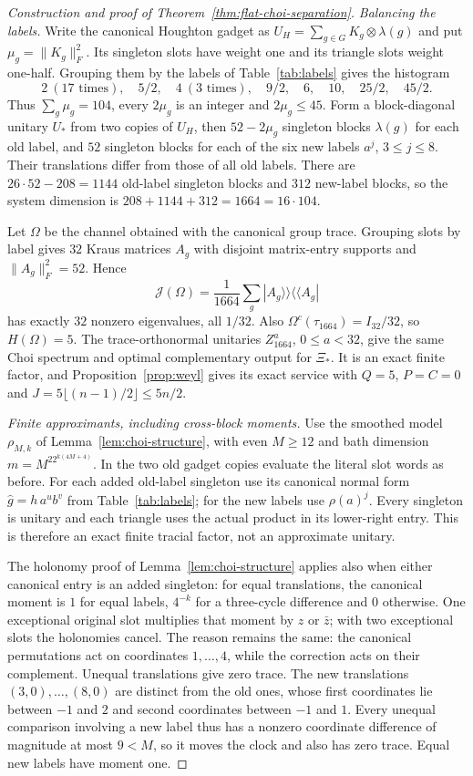 \documentclass[11pt,a4paper]{article}
\theoremstyle{plain}
\theoremstyle{definition}
\theoremstyle{remark}
\begin{document}
\begin{proof}[Construction and proof of Theorem~\ref{thm:flat-choi-separation}]
\emph{Balancing the labels.} Write the canonical Houghton gadget as $U_H=\sum_{g\in G}K_g\otimes\lambda(g)$ and put
$\mu_g=\|K_g\|_F^2$. Its singleton slots have weight one and its triangle slots weight one-half. Grouping them by the labels of
Table~\ref{tab:labels} gives the histogram
\[
2\ (17\text{ times}),\quad 5/2,\quad4\ (3\text{ times}),\quad9/2,\quad6,\quad10,\quad25/2,\quad45/2.
\]
Thus $\sum_g\mu_g=104$, every $2\mu_g$ is an integer and $2\mu_g\le45$. Form a block-diagonal unitary $U_*$ from two copies of $U_H$,
then $52-2\mu_g$ singleton blocks $\lambda(g)$ for each old label, and $52$ singleton blocks for each of the six new labels
$a^j$, $3\le j\le8$. Their translations differ from those of all old labels. There are $26\cdot52-208=1144$ old-label singleton
blocks and $312$ new-label blocks, so the system dimension is $208+1144+312=1664=16\cdot104$.

Let $\Omega$ be the channel obtained with the canonical group trace. Grouping slots by label gives $32$ Kraus matrices $A_g$ with
disjoint matrix-entry supports and $\|A_g\|_F^2=52$. Hence
\[
\mathcal J(\Omega)=\frac1{1664}\sum_g|A_g\rangle\!\rangle\langle\!\langle A_g|
\]
has exactly $32$ nonzero eigenvalues, all $1/32$. Also $\Omega^c(\tau_{1664})=I_{32}/32$, so $H(\Omega)=5$.
The trace-orthonormal unitaries $Z_{1664}^a$, $0\le a<32$, give the same Choi spectrum and optimal complementary output for $\Xi_*$.
It is an exact finite factor, and Proposition~\ref{prop:weyl} gives its exact service with $Q=5$, $P=C=0$ and
$J=5\lfloor(n-1)/2\rfloor\le5n/2$.

\emph{Finite approximants, including cross-block moments.} Use the smoothed model $\rho_{M,k}$ of Lemma~\ref{lem:choi-structure}, with even
$M\ge12$ and bath dimension $m=M^22^{k(4M+4)}$. In the two old gadget copies evaluate the literal slot words as before. For each added
old-label singleton use its canonical normal form $\hat g=h\,a^u b^v$ from Table~\ref{tab:labels}; for the new labels use $\rho(a)^j$.
Every singleton is unitary and each triangle uses the actual product in its lower-right entry. This is therefore an exact finite
tracial factor, not an approximate unitary.

The holonomy proof of Lemma~\ref{lem:choi-structure} applies also when either canonical entry is an added singleton: for equal translations,
the canonical moment is $1$ for equal labels, $4^{-k}$ for a three-cycle difference and $0$ otherwise. One exceptional original slot
multiplies that moment by $z$ or $\bar z$; with two exceptional slots the holonomies cancel. The reason remains the same: the canonical
permutations act on coordinates $1,\ldots,4$, while the correction acts on their complement. Unequal translations give zero trace.
The new translations $(3,0),\ldots,(8,0)$ are distinct from the old ones, whose first coordinates lie between $-1$ and $2$ and second
coordinates between $-1$ and $1$. Every unequal comparison involving a new label thus has a nonzero coordinate difference of magnitude
at most $9<M$, so it moves the clock and also has zero trace. Equal new labels have moment one.


\end{proof}
\end{document}
